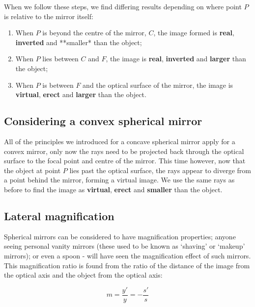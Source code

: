 \documentclass[
]{book}
\providecommand{\tightlist}{%
  \setlength{\itemsep}{0pt}\setlength{\parskip}{0pt}}
\begin{document}
When we follow these steps, we find differing results depending on where point \(P\) is relative to the mirror itself:

\begin{enumerate}
\def\labelenumi{\arabic{enumi}.}
\tightlist
\item
  When \(P\) is beyond the centre of the mirror, \(C\), the image formed is \textbf{real}, \textbf{inverted} and **smaller* than the object;
\item
  When \(P\) lies between \(C\) and \(F\), the image is \textbf{real}, \textbf{inverted} and \textbf{larger} than the object;
\item
  When \(P\) is between \(F\) and the optical surface of the mirror, the image is \textbf{virtual}, \textbf{erect} and \textbf{larger} than the object.
\end{enumerate}

\hypertarget{considering-a-convex-spherical-mirror}{%
\subsection{Considering a convex spherical mirror}\label{considering-a-convex-spherical-mirror}}

All of the principles we introduced for a concave spherical mirror apply for a convex mirror, only now the rays need to be projected back through the optical surface to the focal point and centre of the mirror. This time however, now that the object at point \(P\) lies past the optical surface, the rays appear to diverge from a point behind the mirror, forming a virtual image. We use the same rays as before to find the image as \textbf{virtual}, \textbf{erect} and \textbf{smaller} than the object.

\hypertarget{sec-ch15-lateralmagnificatin}{%
\subsection{Lateral magnification}\label{sec-ch15-lateralmagnificatin}}

Spherical mirrors can be considered to have magnification properties; anyone seeing personal vanity mirrors (these used to be known as `shaving' or `makeup' mirrors); or even a spoon - will have seen the magnification effect of such mirrors. This magnification ratio is found from the ratio of the distance of the image from the optical axis and the object from the optical axis:

\begin{equation}
m = \frac{y'}{y} = - \frac{s'}{s}
\end{equation}
\end{document}
